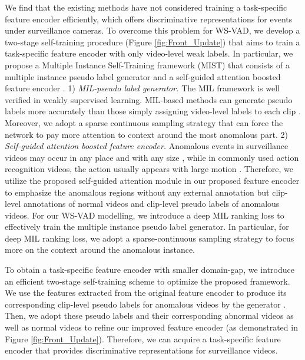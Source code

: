 \documentclass[final]{cvpr}
\newcommand{\ftst}{\textcolor[rgb]{0,0, 0}}
\newcommand{\ftnd}{\textcolor[rgb]{0.,0,0}}
\newcommand{\jcst}{\textcolor[rgb]{0,0,0}}
\newcommand{\jcgam}{\textcolor[rgb]{0.,0.,0}}
\newcommand{\jcla}{\textcolor[rgb]{0.,0.,0}}
\newcommand{\jcca}{\textcolor[rgb]{0,0,0}}
\begin{document}
\jcst{We find that the existing methods have not considered training a task-specific feature encoder efficiently, which offers discriminative representations for events under surveillance cameras.}
\ftst{To overcome this problem for WS-VAD, we develop a two-stage self-training procedure (Figure \ref{fig:Front_Update}) that aims to train a task-specific feature encoder with only video-level weak labels.}
In particular, we propose a Multiple Instance Self-Training framework (MIST) that consists of a multiple instance pseudo label generator and a self-guided attention boosted feature encoder .
1) \textit{MIL-pseudo label generator.}
The MIL framework is well verified in weakly supervised learning. MIL-based methods can generate pseudo labels more accurately than those simply assigning video-level labels to each clip \cite{zhong2019graph}. Moreover, we adopt a sparse continuous sampling strategy that can \jcla{force the network to pay more attention to context around the most anomalous part. }
2) \textit{Self-guided attention boosted feature encoder.} Anomalous events in surveillance videos may occur in any place and with any size \cite{liu2019exploring}, while in commonly used action recognition videos, the action usually appears with large motion
\cite{choi2019can,choi2020unsupervised}. Therefore, we utilize the proposed self-guided attention module in our proposed feature encoder to emphasize the anomalous regions without any external annotation \cite{liu2019exploring} but \ftst{clip-level annotations of normal videos and clip-level pseudo labels of anomalous videos. For our WS-VAD modelling, we introduce a deep MIL ranking loss to effectively train the multiple instance pseudo label generator.
\jcca{In particular, for deep MIL ranking loss, we adopt a sparse-continuous sampling strategy to focus more on the context around the anomalous instance.}
} 


\ftst{To obtain a task-specific feature encoder \jcst{with smaller domain-gap,}
we introduce an efficient two-stage self-training scheme to optimize the proposed framework. We use the features extracted from \jcst{the} \ftnd{original} feature encoder to produce its corresponding clip-level pseudo labels for anomalous videos by the generator . \jcgam{Then,} we adopt these pseudo labels and their corresponding abnormal videos as well as normal videos to refine \ftnd{our improved} feature encoder  (as demonstrated in Figure \ref{fig:Front_Update}). Therefore, we can acquire a task-specific feature encoder
\jcst{that provides discriminative representations for surveillance videos.}}
\end{document}
